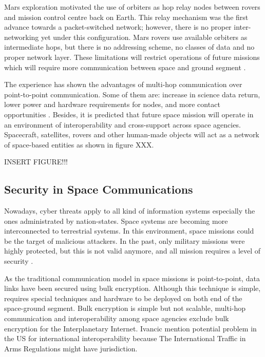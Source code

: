 Mars exploration motivated the use of orbiters as hop relay nodes between rovers and mission control centre back on Earth. This relay mechanism was the first advance towards a packet-switched network; however, there is no proper inter-networking yet under this configuration. Mars rovers use available orbiters as intermediate hops, but there is no addressing scheme, no classes of data and no proper network layer. These limitations will restrict operations of future missions which will require more communication between space and ground segment \cite{rationale2010requirements}. 


The experience has shown the advantages of multi-hop communication over point-to-point communication. Some of them are: increase in science data return, lower power and hardware requirements for nodes, and more contact opportunities \cite{rationale2010requirements}. Besides, it is predicted that future space mission will operate in an environment of interoperability and cross-support across space agencies. Spacecraft, satellites, rovers and other human-made objects will act as a network of space-based entities as shown in figure XXX.




INSERT FIGURE!!!


\subsection{Security in Space Communications}



Nowadays,  cyber threats apply to all kind of information systems especially the ones administrated by nation-states. Space systems are becoming more interconnected to terrestrial systems.   In this environment, space missions could be the target of malicious attackers.  In the past, only military missions were highly protected, but this is not valid anymore, and all mission requires a level of security \cite{book2006security}.

As the traditional communication model in space missions is point-to-point, data links have been secured using bulk encryption. Although this technique is simple, requires special techniques and hardware to be deployed on both end of the space-ground segment.   Bulk encryption is simple but not scalable, multi-hop communication and interoperability among space agencies exclude bulk encryption for the Interplanetary Internet. Ivancic \cite{ivancic2009security} mention potential problem in the US for international interoperability because The International Traffic in Arms Regulations might have jurisdiction.

